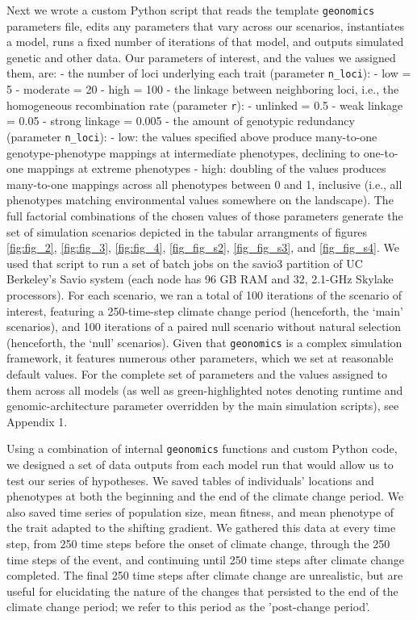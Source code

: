 \documentclass[9pt,twocolumn,twoside,lineno]{pnas-new}
\begin{document}
{Next we wrote a custom Python script that reads the template \texttt{geonomics}
parameters file, edits any parameters that vary 
across our scenarios, instantiates a model, runs a fixed number of iterations 
of that model, and outputs simulated genetic and other data. 
Our parameters of interest, and the values we assigned them, are:
 - the number of loci underlying each trait (parameter \texttt{n\_loci}):
   - low = 5
   - moderate = 20
   - high = 100
 - the linkage between neighboring loci, i.e., the homogeneous recombination rate (parameter \texttt{r}):
   - unlinked = 0.5
   - weak linkage = 0.05
   - strong linkage = 0.005
 - the amount of genotypic redundancy (parameter \texttt{n\_loci}):
   - low: the values specified above produce many-to-one genotype-phenotype mappings at intermediate phenotypes, declining to one-to-one mappings at extreme phenotypes
   - high: doubling of the values produces many-to-one mappings across all phenotypes between 0 and 1, inclusive (i.e., all phenotypes matching environmental values somewhere on the landscape).
The full factorial combinations of the chosen values of those parameters generate the set
of simulation scenarios depicted in the tabular arrangments of figures
\ref{fig:fig_2}, \ref{fig:fig_3}, \ref{fig:fig_4}, \ref{fig_fig_s2}, \ref{fig_fig_s3}, and \ref{fig_fig_s4}.
We used that script to run a set of batch jobs on the 
savio3 partition of UC Berkeley’s Savio system (each node has 96 GB RAM and 32, 
2.1-GHz Skylake processors). For each scenario, we ran a total of 100 iterations of 
the scenario of interest, featuring a 250-time-step climate change period (henceforth, 
the ‘main’ scenarios), and 100 iterations of a paired null scenario without natural 
selection (henceforth, the ‘null’ scenarios). 
Given that \texttt{geonomics} is a complex simulation framework, it features numerous other 
parameters, which we set at reasonable default values.
For the complete set of parameters and the values 
assigned to them across all models
(as well as green-highlighted notes denoting runtime and genomic-architecture
parameter overridden by the main simulation scripts), see Appendix 1.

Using a combination of internal \texttt{geonomics} functions and custom Python code, we 
designed a set of data outputs from each model run that would allow us to test our 
series of hypotheses. We saved tables of individuals’ locations and phenotypes at both
the beginning and the end of the climate change period. We also saved time 
series of population size, mean fitness, and mean phenotype of the trait adapted to 
the shifting gradient. We gathered this data at every time step, from 250 time steps 
before the onset of climate change, through the 250 time steps of the event, and 
continuing until 250 time steps after climate change completed.
The final 250 time steps after climate change are unrealistic, but are useful
for elucidating the nature of the changes that persisted to the end of the climate change period;
we refer to this period as the 'post-change period'.

}
\end{document}
